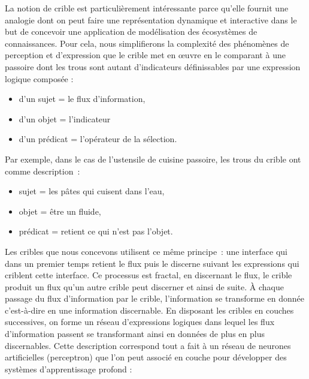 \documentclass[
  letterpaper,
  DIV=11,
  numbers=noendperiod]{scrreprt}
\begin{document}
La notion de crible est particulièrement intéressante parce qu'elle
fournit une analogie dont on peut faire une représentation dynamique et
interactive dans le but de concevoir une application de modélisation des
écosystèmes de connaissances. Pour cela, nous simplifierons la
complexité des phénomènes de perception et d'expression que le crible
met en œuvre en le comparant à une passoire dont les trous sont autant
d'indicateurs définissables par une expression logique composée :

\begin{itemize}
\item
  d'un sujet = le flux d'information,
\item
  d'un objet = l'indicateur
\item
  d'un prédicat = l'opérateur de la sélection.
\end{itemize}

Par exemple, dans le cas de l'ustensile de cuisine passoire, les trous
du crible ont comme description~:

\begin{itemize}
\item
  sujet = les pâtes qui cuisent dans l'eau,
\item
  objet = être un fluide,
\item
  prédicat = retient ce qui n'est pas l'objet.
\end{itemize}

Les cribles que nous concevons utilisent ce même principe~: une
interface qui dans un premier temps retient le flux puis le discerne
suivant les expressions qui criblent cette interface. Ce processus est
fractal, en discernant le flux, le crible produit un flux qu'un autre
crible peut discerner et ainsi de suite. À chaque passage du flux
d'information par le crible, l'information se transforme en donnée
c'est-à-dire en une information discernable. En disposant les cribles en
couches successives, on forme un réseau d'expressions logiques dans
lequel les flux d'information passent se transformant ainsi en données
de plus en plus discernables. Cette description correspond tout a fait à
un réseau de neurones artificielles (perceptron) que l'on peut associé
en couche pour développer des systèmes d'apprentissage profond :
\end{document}
